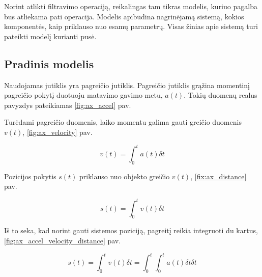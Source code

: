 Norint atlikti filtravimo operaciją, reikalingas tam tikras modelis, kuriuo pagalba bus atliekama pati operacija.
Modelis apibūdina nagrinėjamą sistemą, kokios komponentės, kaip priklauso nuo esamų parametrų.
Visas žinias apie sistemą turi pateikti modelį kurianti pusė.

\subsection{Pradinis modelis}

Naudojamas jutiklis yra pagreičio jutiklis.
Pagreičio jutiklis grąžina momentinį pagreičio pokytį duotuoju matavimo gavimo metu, $a(t)$.
Tokių duomenų realus pavyzdys pateikiamas \ref{fig:ax_accel} pav.

Turėdami pagreičio duomenis, laiko momentu galima gauti greičio duomenis $v(t)$, \ref{fig:ax_velocity} pav.

\begin{equation}
    v(t) = \int_0^t a(t) \delta t
\end{equation}

Pozicijos pokytis $s(t)$ priklauso nuo objekto greičio $v(t)$, \ref{fix:ax_distance} pav.

\begin{equation}
    s(t) = \int_0^tv(t) \delta t
\end{equation}

Iš to seka, kad norint gauti sistemos poziciją, pagreitį reikia integruoti du kartus, \ref{fig:ax_accel_velocity_distance} pav.

\begin{equation}
    s(t) = \int_0^tv(t) \delta t = \int_0^t \int_0^t a(t) \delta t \delta t
\end{equation}

